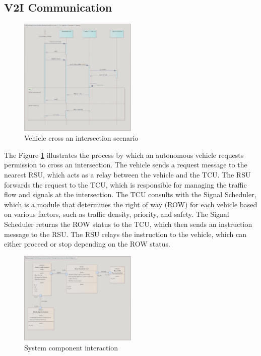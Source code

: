 \subsection{V2I Communication}
\label{sec:design_and_implementation}
\begin{figure}[ht]
    \centering
    \includegraphics[width=0.5\textwidth]{images/intersection_management.png}
    \caption{Vehicle cross an intersection scenario }
    \label{img:intersection_management}
\end{figure}
 The Figure \ref{img:intersection_management} illustrates the process by which an autonomous vehicle requests permission to cross an intersection. The vehicle sends a request message to the nearest RSU, which acts as a relay between the vehicle and the TCU. The RSU forwards the request to the TCU, which is responsible for managing the traffic flow and signals at the intersection. The TCU consults with the Signal Scheduler, which is a module that determines the right of way (ROW) for each vehicle based on various factors, such as traffic density, priority, and safety. The Signal Scheduler returns the ROW status to the TCU, which then sends an instruction message to the RSU. The RSU relays the instruction to the vehicle, which can either proceed or stop depending on the ROW status. 

\begin{figure}[ht]
    \centering
\includegraphics[width=0.5\textwidth]{images/v2i_ibd.png}
    \caption{System component interaction}
    \label{img:v2i_ibd}
\end{figure}

